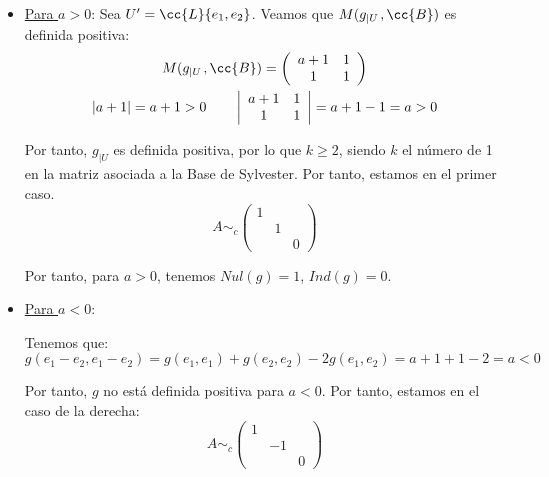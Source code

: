 \begin{ejercicio}
\begin{enumerate}
\begin{itemize}
            \begin{itemize}
                \item \underline{Para $a>0$}:
                Sea $U'=\cc{L}\{e_1, e_2\}$. Veamos que $M(g_{\left|U \right.}, \cc{B})$ es definida positiva:
                \begin{gather*}
                    M(g_{\left|U \right.}, \cc{B}) = \left( \begin{array}{cc}
                        a+1 & 1 \\
                        1 & 1
                    \end{array} \right) \\
                    |a+1|=a+1 > 0 \qquad \left| \begin{array}{cc}
                        a+1 & 1 \\
                        1 & 1
                    \end{array} \right| = a+1 -1 = a>0
                \end{gather*}
                
                Por tanto, $g_{\left|U \right.}$ es definida positiva, por lo que $k \geq 2$, siendo $k$ el número de 1 en la matriz asociada a la Base de Sylvester. Por tanto, estamos en el primer caso.
                \begin{equation*}
                    A \sim_c \left(\begin{array}{ccc}
                        1 &  \\
                        & 1 \\
                        && 0 
                    \end{array} \right)
                \end{equation*}
    
                Por tanto, para $a>0$, tenemos $Nul(g)=1$, $Ind(g)=0$.

                \item \underline{Para $a<0$}:

                Tenemos que:
                \begin{equation*}
                    g(e_1-e_2, e_1-e_2) = g(e_1,e_1) + g(e_2,e_2) -2g(e_1, e_2) = a+1 +1 -2 = a <0
                \end{equation*}

                Por tanto, $g$ no está definida positiva para $a<0$. Por tanto, estamos en el caso de la derecha:
                \begin{equation*}
                        A \sim_c \left(\begin{array}{ccc}
                            1 &  \\
                            & -1 \\
                            && 0 
                        \end{array} \right)
                    \end{equation*}
                

\end{itemize}
\end{itemize}
\end{enumerate}
\end{ejercicio}
